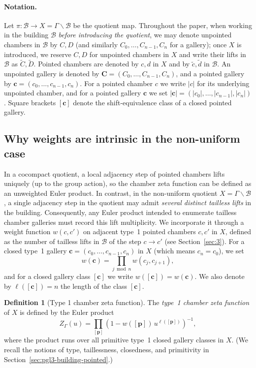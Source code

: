 \documentclass[11pt]{amsart}
\theoremstyle{definition}
\newtheorem{definition}[thm]{Definition}
\theoremstyle{remark}
\numberwithin{equation}{section}
\begin{document}
\medskip

\paragraph{Notation.}
Let $\pi:\mathcal{B}\to X=\Gamma\backslash\mathcal{B}$ be the quotient map.
Throughout the paper, when working in the building $\mathcal{B}$ \emph{before introducing the quotient},
we may denote unpointed chambers in $\mathcal{B}$ by $C,D$ (and similarly $C_0,\dots,C_{n-1},C_n$ for a gallery);
once $X$ is introduced, we reserve $C,D$ for unpointed chambers in $X$ and write their lifts in $\mathcal{B}$ as
$\widetilde{C},\widetilde{D}$.
Pointed chambers are denoted by $c,d$ in $X$ and by $\tilde c,\tilde d$ in $\mathcal{B}$.
An unpointed gallery is denoted by $\mathbf{C}=(C_0,\dots,C_{n-1},C_n)$, and a pointed gallery by
$\mathbf{c}=(c_0,\dots,c_{n-1},c_n)$.
For a pointed chamber $c$ we write $|c|$ for its underlying unpointed chamber, and for a pointed gallery
$\mathbf{c}$ we set $|\mathbf{c}|=(|c_0|,\ldots,|c_{n-1}|,|c_n|)$.
Square brackets $[\mathbf{c}]$ denote the shift-equivalence class of a closed pointed gallery.



\subsection*{Why weights are intrinsic in the non-uniform case}
In a cocompact quotient, a local adjacency step of pointed chambers lifts uniquely (up to the group action), so the chamber zeta function can be defined as an unweighted Euler product.
In contrast, in the non-uniform quotient $X=\Gamma\backslash\mathcal{B}$, a single adjacency step in the quotient may admit \emph{several distinct tailless lifts} in the building.
Consequently, any Euler product intended to enumerate tailless chamber galleries must record this lift multiplicity.
We incorporate it through a weight function $w(c,c')$ on adjacent type~1 pointed chambers $c,c'$ in $X$, defined as the number of tailless lifts in $\mathcal{B}$ of the step $c\to c'$ (see Section~\ref{sec:3}).
For a closed type~1 gallery $\mathbf{c}=(c_0,\dots,c_{n-1},c_n)$ in $X$ (which means $c_n=c_0$), we set
\[
w(\mathbf{c})=\prod_{j \bmod n} w(c_j,c_{j+1}),
\]
and for a closed gallery class $[\mathbf{c}]$ we write $w([\mathbf{c}])=w(\mathbf{c})$. We also denote by $\ell([\mathbf{c}])=n$ the length of the class $[\mathbf{c}]$.

\medskip

\begin{definition}[Type 1 chamber zeta function]
The \emph{type~1 chamber zeta function} of $X$ is defined by the Euler product
\[
Z_\Gamma(u)
=
\prod_{[\mathbf{p}]}
\left(1-w([\mathbf{p}])\,u^{\ell([\mathbf{p}])}\right)^{-1},
\]
where the product runs over all primitive type~1 closed gallery classes in $X$.
(We recall the notions of type, taillessness, closedness, and primitivity in Section~\ref{sec:pgl3-building-pointed}.)
\end{definition}
\medskip
\end{document}
